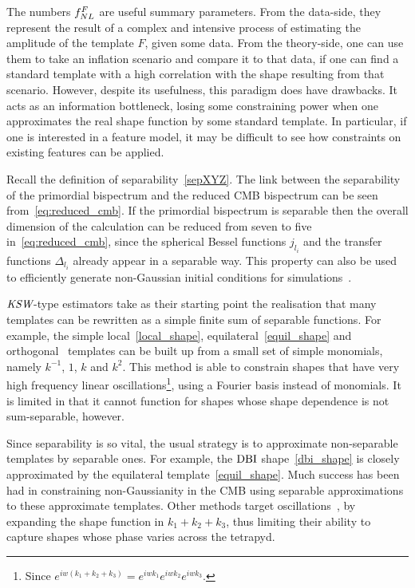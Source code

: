 The numbers $f_{NL}^F$ are useful summary parameters.
From the data-side, they represent the result of
a complex and intensive process
of estimating the amplitude of the template $F$,
given some data. From the theory-side, one
can use them to take an inflation scenario and compare it
to that data, if one can find a standard template
with a high correlation with the shape resulting
from that scenario.
However, despite its usefulness, this paradigm does
have drawbacks. It acts as an information bottleneck,
losing some constraining power when one approximates
the real shape function by some standard template.
In particular, if one is interested in a feature model,
it may be difficult to see how constraints on existing
features can be applied.


Recall the definition of separability~\eqref{sepXYZ}.
The link between the separability of the primordial bispectrum
and the reduced CMB bispectrum can be seen from~\eqref{eq:reduced_cmb}.
If the primordial bispectrum is separable then the overall dimension
of the calculation can be reduced from seven to five in~\eqref{eq:reduced_cmb},
since the spherical Bessel functions $j_{l_i}$ and the
transfer functions $\Delta_{l_i}$ already appear in a separable way.
This property can also be used to
efficiently generate non-Gaussian initial conditions
for simulations~\cite{Scoccimarro_2012}.


    ${\textit{\text{KSW}}}$-type estimators take as their starting point the realisation that many
    templates can be rewritten as a simple finite sum of separable functions.
    For example, the simple local~\eqref{local_shape}, equilateral~\eqref{equil_shape}
    and orthogonal~\cite{Planck_NG_2013}
    templates can be built up from a small set of
    simple monomials, namely $k^{-1}$, $1$, $k$ and $k^{2}$.
    This method is able to constrain shapes that have very high frequency linear oscillations\footnote{
    Since $e^{iw(k_1+k_2+k_3)}=e^{iwk_1}e^{iwk_2}e^{iwk_3}$.},
    using a Fourier basis instead of monomials.
    It is limited in that it cannot function for shapes whose shape dependence is not
    sum-separable, however.


Since separability is so vital, the usual strategy is to approximate non-separable templates
by separable ones.
For example, the $\text{DBI}$ shape~\eqref{dbi_shape} is closely approximated by the equilateral
template~\eqref{equil_shape}.
Much success has been had in constraining non-Gaussianity
in the CMB using separable approximations to these approximate templates.
Other methods target oscillations~\cite{reso_estimator, excited_estimator},
by expanding the shape function
in $k_1+k_2+k_3$, thus limiting their ability to capture shapes whose
phase varies across the tetrapyd.


